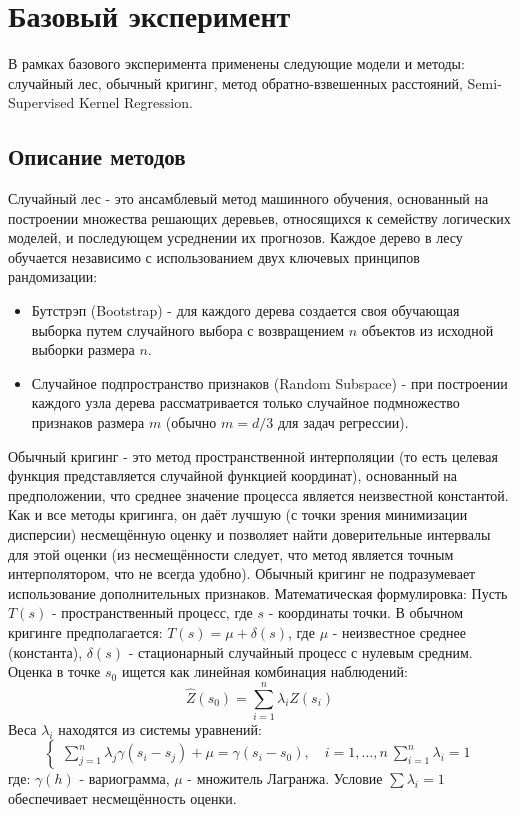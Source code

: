 \documentclass{article}
\begin{document}
\section{Базовый эксперимент}
В рамках базового эксперимента применены следующие модели и методы: случайный лес, обычный кригинг, метод обратно-взвешенных расстояний, Semi-Supervised Kernel Regression.
\subsection{Описание методов}

Случайный лес - это ансамблевый метод машинного обучения, основанный на построении множества решающих деревьев, относящихся к семейству логических моделей, и последующем усреднении их прогнозов. Каждое дерево в лесу обучается независимо с использованием двух ключевых принципов рандомизации:
\begin{itemize}
    \item Бутстрэп (Bootstrap) - для каждого дерева создается своя обучающая выборка путем случайного выбора с возвращением $n$ объектов из исходной выборки размера $n$.
    \item Случайное подпространство признаков (Random Subspace) - при построении каждого узла дерева рассматривается только случайное подмножество признаков размера $m$ (обычно $m = d / 3$ для задач регрессии).
\end{itemize}


Обычный кригинг  - это метод пространственной интерполяции (то есть целевая функция представляется случайной функцией координат), основанный на предположении, что среднее значение процесса является неизвестной константой. Как и все методы кригинга, он даёт лучшую (с точки зрения минимизации дисперсии) несмещённую оценку и позволяет найти доверительные интервалы для этой оценки (из несмещённости следует, что метод является точным интерполятором, что не всегда удобно). Обычный кригинг не подразумевает использование дополнительных признаков.
Математическая формулировка: Пусть $T(s)$ - пространственный процесс, где $s$ - координаты точки. В обычном кригинге предполагается: $T(s) = \mu + \delta(s)$, где $\mu$ - неизвестное среднее (константа), $\delta(s)$ - стационарный случайный процесс с нулевым средним. Оценка в точке $s_0$ ищется как линейная комбинация наблюдений:
$$\hat{Z}(s_0) = \sum_{i=1}^n \lambda_i Z(s_i)$$
Веса $\lambda_i$ находятся из системы уравнений:
$$\begin{cases}
\sum\limits_{j=1}^n \lambda_j \gamma(s_i - s_j) + \mu = \gamma(s_i - s_0), \quad i = 1,\ldots,n \
\sum\limits_{i=1}^n \lambda_i = 1
\end{cases}$$
где: $\gamma(h)$ - вариограмма, $\mu$ - множитель Лагранжа. Условие $\sum \lambda_i = 1$ обеспечивает несмещённость оценки.
\end{document}
